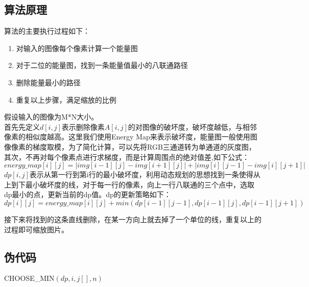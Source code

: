 \documentclass[UTF8]{ctexart}
\begin{document}
\subsection{算法原理}

算法的主要执行过程如下：
\begin{enumerate}
    \item 对输入的图像每个像素计算一个能量图
    \item 对于二位的能量图，找到一条能量值最小的八联通路径
    \item 删除能量最小的路径
    \item 重复以上步骤，满足缩放的比例
\end{enumerate}

假设输入的图像为M*N大小。\\
首先先定义$d[i, j]$表示删除像素$A[i, j]$的对图像的破坏度，破坏度越低，与相邻像素的相似度越高。这里我们使用Energy Map来表示破坏度，能量图一般使用图像像素的梯度取模，为了简化计算，可以先将RGB三通道转为单通道的灰度图，其次，不再对每个像素点进行求梯度，而是计算周围点的绝对值差,如下公式：
\begin{equation*}
    energy\_map[i][j] = \left\lvert img[i-1][j] - img[i+1][j] \right\rvert + \left\lvert img[i][j-1] - img[i][j+1] \right\rvert
\end{equation*}
$dp[i, j]$表示从第一行到第i行的最小破坏度，利用动态规划的思想找到一条使得从上到下最小破坏度的线，对于每一行的像素，向上一行八联通的三个点中，选取dp最小的点，更新当前的dp值。dp的更新策略如下：
\begin{equation*}
    dp[i][j] = energy\_map[i][j] + min(dp[i-1][j-1], dp[i-1][j], dp[i-1][j+1])
\end{equation*}

接下来将找到的这条直线删除，在某一方向上就去掉了一个单位的线，重复以上的过程即可缩放图片。

\subsection{伪代码}
\begin{algorithm}[H]
	\caption{CHOOSE\_MIN$(dp, i, j[], n)$}   %
    \begin{algorithmic}[1]  %
       
        \ENDIF
        
	\end{algorithmic}
\end{algorithm}
\end{document}
